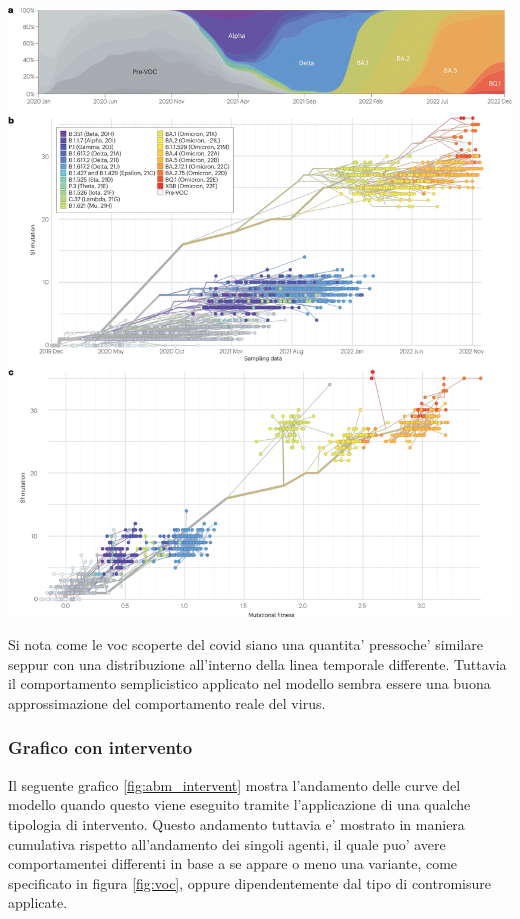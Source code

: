 \begin{minipage}{\linewidth}
	\centering
	\includegraphics[scale=0.15]{img/41579_2023_878_Fig3_HTML.png}
	\label{fig:covid_mutation}
\end{minipage}

Si nota come le voc scoperte del covid siano una quantita' pressoche' similare seppur con una 
distribuzione all'interno della linea temporale differente. Tuttavia il comportamento semplicistico 
applicato nel modello sembra essere una buona approssimazione del comportamento reale del virus.

\subsubsection*{Grafico con intervento}

Il seguente grafico \ref{fig:abm_intervent} mostra l'andamento delle curve del modello
quando questo viene eseguito tramite l'applicazione di una qualche tipologia di intervento. 
Questo andamento tuttavia e' mostrato in maniera cumulativa rispetto all'andamento dei singoli agenti, il quale puo' avere comportamentei 
differenti in base a se appare o meno una variante, come specificato in figura \ref{fig:voc}, oppure 
dipendentemente dal tipo di contromisure applicate. 

